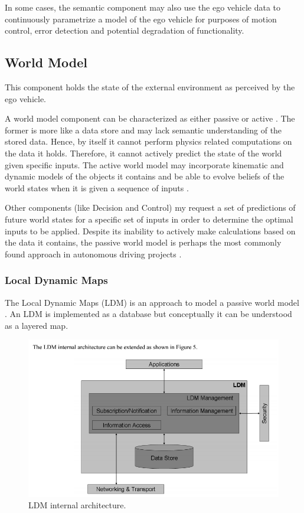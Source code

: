 In some cases, the semantic component may also use the ego vehicle data to continuously parametrize a model of the ego vehicle for purposes of motion control, error detection and potential degradation of functionality.

\subsection{World Model}
This component holds the state of the external environment as perceived by the ego vehicle.

A world model component can be characterized as either passive or active \cite{Bahere}. 
The former is more like a data store and may lack semantic understanding of the stored data. 
Hence, by itself it cannot perform physics related computations on the data it holds. 
Therefore, it cannot actively predict the state of the world given specific inputs. 
The active world model may incorporate kinematic and dynamic models of the objects it contains 
and be able to evolve beliefs of the world states when it is given a sequence of inputs \cite{Bahere}.

Other components (like Decision and Control) my request a set of predictions of future world states for a specific set of
inputs in order to determine the optimal inputs to be applied.
Despite its inability to actively make calculations based on the data it contains, the passive world model is perhaps the most commonly found approach in autonomous driving projects \cite{Bahere}. 




\subsubsection{Local Dynamic Maps}

The Local Dynamic Maps (LDM) is an approach to model a passive world model \cite{Bahere, ETSITR102}. 
An LDM is implemented as a database but conceptually it can be understood as a layered map. 

\begin{figure}[!htb]
\begin{center}
\includegraphics[scale=0.380]{img/ldm_internal_architectuer.png}
\end{center}
\caption{LDM internal architecture.}
\label{ldm_internal_architectuer}
\end{figure}

